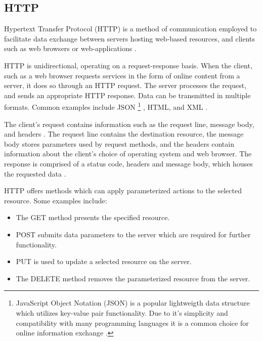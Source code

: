 \documentclass{thesis-ekf}
\theoremstyle{definition}
\theoremstyle{remark}
\begin{document}
{\subsection{HTTP} \label{sub-http}
Hypertext Transfer Protocol (HTTP) is a method of communication employed to facilitate data exchange between servers hosting web-based resources, and clients such as web browsers or web-applications \cite{mdn-http}.

HTTP is unidirectional, operating on a request-response basis. When the client, such as a web browser requests services in the form of online content from a server, it does so through an HTTP request. The server processes the request, and sends an appropriate HTTP response. Data can be transmitted in multiple formats. Common examples include JSON 
 \footnote{JavaScript Object Notation (JSON) is a popular lightweigth data structure which utilizes key-value pair functionality. Due to it's simplicity and compatibility with many programming languages it is a common choice for online information exchange \cite{mdn-json}.}
, HTML, and XML \cite{wiki-http}.

The client's request contains information such as the request line, message body, and headers \cite{req-head}. The request line contains the destination resource, the message body stores parameters used by request methods, and the headers contain information about the client's choice of operating system and web browser. The response is comprised of a status code, headers and message body, which houses the requested data \cite{wiki-http}.

HTTP offers methods which can apply parameterized actions to the selected resource. Some examples include:
\begin{itemize}
	\item The GET method presents the specified resource. 
	\item POST submits data parameters to the server which are required for further functionality.
	\item PUT is used to update a selected resource on the server.
	\item The DELETE method removes the parameterized resource from the server.
\end{itemize}

}
\end{document}
